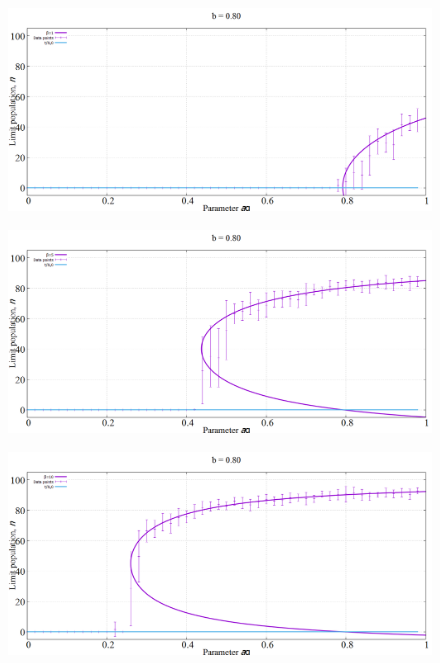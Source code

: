 \begin{figure}[h!]
 \centering
  \includegraphics[width=\linewidth]{images/appendix/simexpt/13.png}
\end{figure}

\begin{figure}[h!]
 \centering
  \includegraphics[width=\linewidth]{images/appendix/simexpt/14.png}
\end{figure}

\begin{figure}[h!]
 \centering
  \includegraphics[width=\linewidth]{images/appendix/simexpt/15.png}
\end{figure}